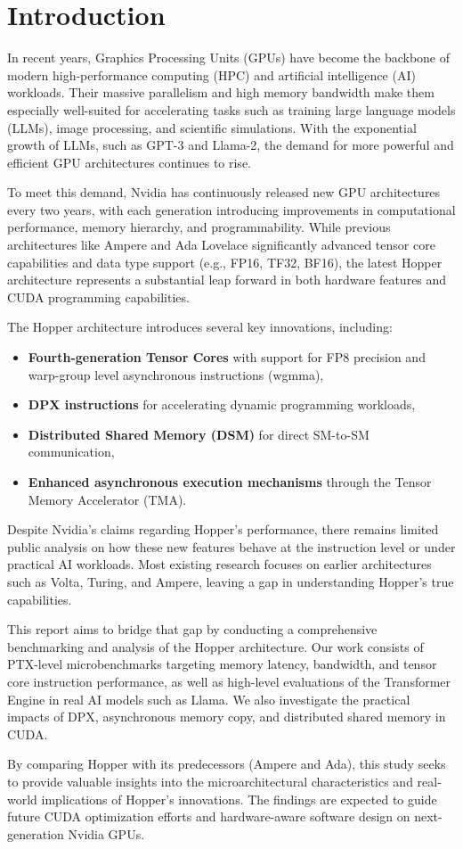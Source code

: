 \section{Introduction}

In recent years, Graphics Processing Units (GPUs) have become the backbone of modern high-performance computing (HPC) and artificial intelligence (AI) workloads. Their massive parallelism and high memory bandwidth make them especially well-suited for accelerating tasks such as training large language models (LLMs), image processing, and scientific simulations. With the exponential growth of LLMs, such as GPT-3 and Llama-2, the demand for more powerful and efficient GPU architectures continues to rise.

To meet this demand, Nvidia has continuously released new GPU architectures every two years, with each generation introducing improvements in computational performance, memory hierarchy, and programmability. While previous architectures like Ampere and Ada Lovelace significantly advanced tensor core capabilities and data type support (e.g., FP16, TF32, BF16), the latest Hopper architecture represents a substantial leap forward in both hardware features and CUDA programming capabilities.

The Hopper architecture introduces several key innovations\cite{luo2024hopper}, including:
\begin{itemize}
    \item \textbf{Fourth-generation Tensor Cores} with support for FP8 precision and warp-group level asynchronous instructions (wgmma),
    \item \textbf{DPX instructions} for accelerating dynamic programming workloads,
    \item \textbf{Distributed Shared Memory (DSM)} for direct SM-to-SM communication,
    \item \textbf{Enhanced asynchronous execution mechanisms} through the Tensor Memory Accelerator (TMA).
\end{itemize}

Despite Nvidia's claims regarding Hopper’s performance, there remains limited public analysis on how these new features behave at the instruction level or under practical AI workloads. Most existing research focuses on earlier architectures such as Volta, Turing, and Ampere, leaving a gap in understanding Hopper's true capabilities.

This report aims to bridge that gap by conducting a comprehensive benchmarking and analysis of the Hopper architecture. Our work consists of PTX-level microbenchmarks targeting memory latency, bandwidth, and tensor core instruction performance, as well as high-level evaluations of the Transformer Engine in real AI models such as Llama. We also investigate the practical impacts of DPX, asynchronous memory copy, and distributed shared memory in CUDA.

By comparing Hopper with its predecessors (Ampere and Ada), this study seeks to provide valuable insights into the microarchitectural characteristics and real-world implications of Hopper’s innovations. The findings are expected to guide future CUDA optimization efforts and hardware-aware software design on next-generation Nvidia GPUs.
